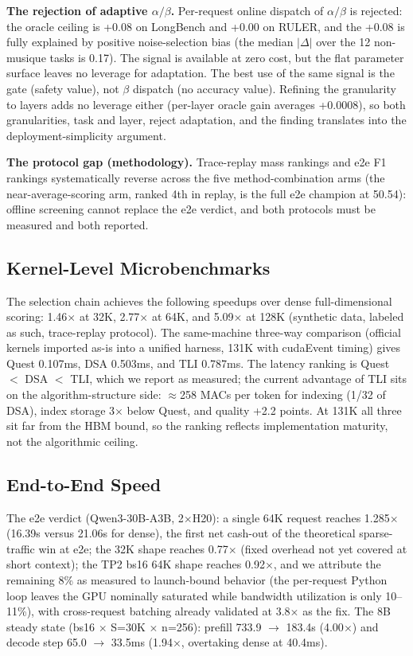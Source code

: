 \documentclass[11pt]{article}
\begin{document}
\textbf{The rejection of adaptive $\alpha/\beta$.} Per-request online dispatch of $\alpha/\beta$ is rejected: the oracle ceiling is +0.08 on LongBench and +0.00 on RULER, and the +0.08 is fully explained by positive noise-selection bias (the median $|\Delta|$ over the 12 non-musique tasks is 0.17). The signal is available at zero cost, but the flat parameter surface leaves no leverage for adaptation. The best use of the same signal is the gate (safety value), not $\beta$ dispatch (no accuracy value). Refining the granularity to layers adds no leverage either (per-layer oracle gain averages +0.0008), so both granularities, task and layer, reject adaptation, and the finding translates into the deployment-simplicity argument.

\textbf{The protocol gap (methodology).} Trace-replay mass rankings and e2e F1 rankings systematically reverse across the five method-combination arms (the near-average-scoring arm, ranked 4th in replay, is the full e2e champion at 50.54): offline screening cannot replace the e2e verdict, and both protocols must be measured and both reported.

\subsection{Kernel-Level Microbenchmarks}

The selection chain achieves the following speedups over dense full-dimensional scoring: 1.46$\times$ at 32K, 2.77$\times$ at 64K, and 5.09$\times$ at 128K (synthetic data, labeled as such, trace-replay protocol). The same-machine three-way comparison (official kernels imported as-is into a unified harness, 131K with cudaEvent timing) gives Quest 0.107ms, DSA 0.503ms, and TLI 0.787ms. The latency ranking is Quest $<$ DSA $<$ TLI, which we report as measured; the current advantage of TLI sits on the algorithm-structure side: $\approx$258 MACs per token for indexing (1/32 of DSA), index storage 3$\times$ below Quest, and quality +2.2 points. At 131K all three sit far from the HBM bound, so the ranking reflects implementation maturity, not the algorithmic ceiling.

\subsection{End-to-End Speed}

The e2e verdict (Qwen3-30B-A3B, 2$\times$H20): a single 64K request reaches 1.285$\times$ (16.39s versus 21.06s for dense), the first net cash-out of the theoretical sparse-traffic win at e2e; the 32K shape reaches 0.77$\times$ (fixed overhead not yet covered at short context); the TP2 bs16 64K shape reaches 0.92$\times$, and we attribute the remaining 8\% as measured to launch-bound behavior (the per-request Python loop leaves the GPU nominally saturated while bandwidth utilization is only 10--11\%), with cross-request batching already validated at 3.8$\times$ as the fix. The 8B steady state (bs16 $\times$ S=30K $\times$ n=256): prefill 733.9 $\rightarrow$ 183.4s (4.00$\times$) and decode step 65.0 $\rightarrow$ 33.5ms (1.94$\times$, overtaking dense at 40.4ms).
\end{document}

